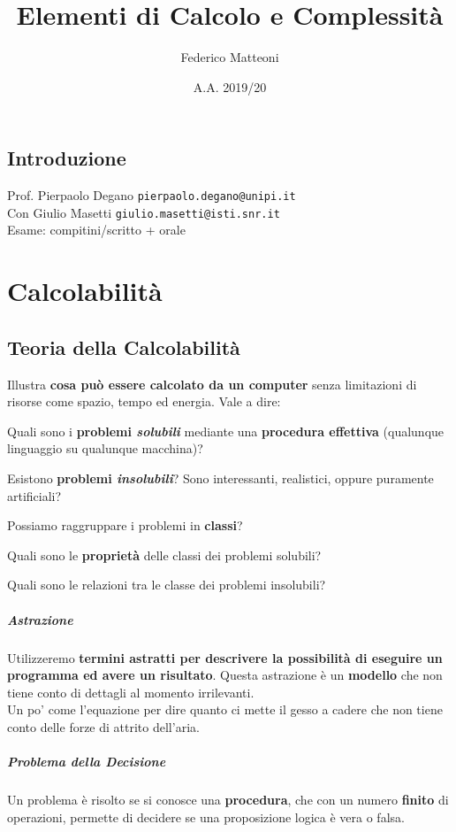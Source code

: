 \documentclass[10pt]{book}
\begin{document}
\renewcommand*\contentsname{Indice}
\title{Elementi di Calcolo e Complessità}
\author{Federico Matteoni}
\date{A.A. 2019/20}
\maketitle
\tableofcontents
\pagebreak
\section*{Introduzione}
Prof. Pierpaolo Degano \texttt{pierpaolo.degano@unipi.it}\\
Con Giulio Masetti \texttt{giulio.masetti@isti.snr.it}\\
Esame: compitini/scritto + orale
\pagebreak
\chapter{Calcolabilità}
\section{Teoria della Calcolabilità}
Illustra \textbf{cosa può essere calcolato da un computer} senza limitazioni di risorse come spazio, tempo ed energia. Vale a dire:
\begin{list}{-}{}
	\item Quali sono i \textbf{problemi \textit{solubili}} mediante una \textbf{procedura effettiva} (qualunque linguaggio su qualunque macchina)?
	\item Esistono \textbf{problemi \textit{insolubili}}? Sono interessanti, realistici, oppure puramente artificiali?
	\item Possiamo raggruppare i problemi in \textbf{classi}?
	\item Quali sono le \textbf{proprietà} delle classi dei problemi solubili?
	\item Quali sono le relazioni tra le classe dei problemi insolubili?
\end{list}
\paragraph{Astrazione} Utilizzeremo \textbf{termini astratti per descrivere la possibilità di eseguire un programma ed avere un risultato}. Questa astrazione è un \textbf{modello} che non tiene conto di dettagli al momento irrilevanti.\\
Un po' come l'equazione per dire quanto ci mette il gesso a cadere che non tiene conto delle forze di attrito dell'aria.
\paragraph{Problema della Decisione} Un problema è risolto se si conosce una \textbf{procedura}, che con un numero \textbf{finito} di operazioni, permette di decidere se una proposizione logica è vera o falsa.
\end{document}
